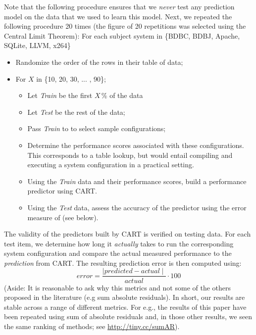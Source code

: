 Note that the following procedure ensures that
we \textit{never} test any prediction model on the data that we used to learn this model. Next, we repeated the following procedure 20 times (the figure of 20 repetitions was
selected using the Central Limit Theorem): 
For each subject system in \{BDBC, BDBJ, Apache, SQLite, LLVM, x264\}
\begin{itemize}
\item Randomize the order of the rows in their table of data;
\item For $X$ in \{10, 20, 30, ... , 90\};
\begin{itemize}
\item Let {\em Train} be the first $X$\,\% of the data 
\item Let {\em Test} be the rest of the data;
\item Pass {\em Train} to \what to select   sample   configurations;
\item Determine the performance scores associated with these configurations. This corresponds to a table lookup, but would entail compiling and executing a system configuration in a practical setting.
\item Using the {\em Train}  data and their performance scores, build a performance predictor using CART.
\item Using the {\em Test} data, assess the accuracy of the predictor using the error 
measure of  (see below).
\end{itemize}
\end{itemize}


The validity of the predictors built by CART is verified on testing data. 
For each  test item, we determine how long it {\em actually} takes to run the corresponding system configuration and compare the actual measured performance to the {\em prediction} from CART. The resulting prediction error is then computed using:
\begin{equation}\label{eq:err}
\mathit{error}=\frac{\mid\mathit{predicted} - \mathit{actual}\mid}{\mathit{actual}} \cdot 100
\end{equation}
(Aside: It is reasonable to ask why this metrics and not some of the others proposed
in the literature (e.g sum absolute residuals). In short, our results are stable
across a range of different metrics. For e.g., the results of this paper have
been repeated using sum of absolute residuals and, in those other results,
we seen the same ranking of methods; see  \url{http://tiny.cc/sumAR}).


